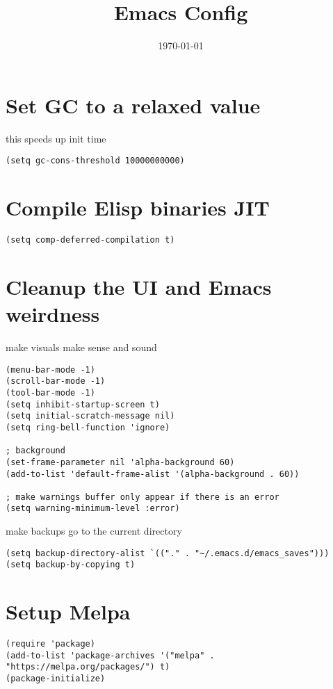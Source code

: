 \documentclass[11pt]{article}
\date{\today}
\title{Emacs Config}
\begin{document}
\maketitle
\tableofcontents

\section{Set GC to a relaxed value}
\label{sec:orgc2ed478}
this speeds up init time
\begin{verbatim}
(setq gc-cons-threshold 10000000000)
\end{verbatim}
\section{Compile Elisp binaries JIT}
\label{sec:org8fe55eb}
\begin{verbatim}
(setq comp-deferred-compilation t)
\end{verbatim}
\section{Cleanup the UI and Emacs weirdness}
\label{sec:orgaa956ba}
make visuals make sense and sound

\begin{verbatim}
(menu-bar-mode -1)
(scroll-bar-mode -1)
(tool-bar-mode -1)
(setq inhibit-startup-screen t)
(setq initial-scratch-message nil)
(setq ring-bell-function 'ignore)

; background
(set-frame-parameter nil 'alpha-background 60)
(add-to-list 'default-frame-alist '(alpha-background . 60))

; make warnings buffer only appear if there is an error
(setq warning-minimum-level :error)
\end{verbatim}

make backups go to the current directory

\begin{verbatim}
(setq backup-directory-alist `(("." . "~/.emacs.d/emacs_saves")))
(setq backup-by-copying t)
\end{verbatim}
\section{Setup Melpa}
\label{sec:orgfff757f}
\begin{verbatim}
(require 'package)
(add-to-list 'package-archives '("melpa" . "https://melpa.org/packages/") t)
(package-initialize)
\end{verbatim}
\end{document}
